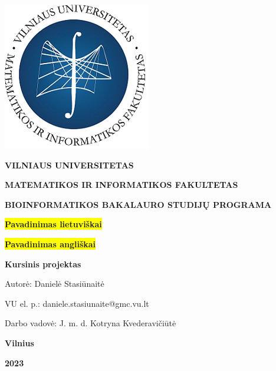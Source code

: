 \documentclass[12pt]{article}
\begin{document}

\begin{titlepage}
\vskip 20pt
\begin{center}
\includegraphics[scale=0.5]{MIF}
\end{center}


\vskip 20pt
\centerline{\bf \large \textbf{VILNIAUS UNIVERSITETAS}}
\bigskip
\centerline{\large \textbf{MATEMATIKOS IR INFORMATIKOS FAKULTETAS}}
\bigskip
\centerline{\large \textbf{BIOINFORMATIKOS BAKALAURO STUDIJŲ PROGRAMA}}

\vskip 90pt
\begin{center}
    {\bf \LARGE \colorbox{yellow}{Pavadinimas lietuviškai}}
\end{center}
\begin{center}
    {\bf \Large \colorbox{yellow}{Pavadinimas angliškai}}
\end{center}
\vskip 20pt
\centerline{\bf \large \textbf{Kursinis projektas}}
\bigskip
\vskip 40pt

\hskip 140pt {\large Autorė: Danielė Stasiūnaitė}

\hskip 140pt{\large VU el. p.: daniele.stasiunaite@gmc.vu.lt}
\bigskip
\vskip 20pt

\hskip 140pt {\large Darbo vadovė: J. m. d. Kotryna Kvederavičiūtė}
\vskip 60pt
\vskip 40pt
\centerline{\large \textbf{Vilnius}}
\centerline{\large \textbf{2023}}
\newpage
\end{titlepage}



\tableofcontents
\newpage

\end{document}
